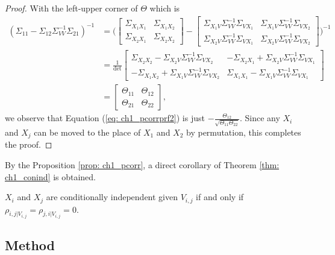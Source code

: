 \begin{proof}
    With the left-upper corner of $\Theta$ which is
    \begin{align*}
        (\Sigma_{11}-\Sigma_{12}\Sigma_{VV}^{-1}\Sigma_{21})^{-1} &= \bigg(\begin{bmatrix}
            \Sigma_{X_1X_1} & \Sigma_{X_1X_2} \\
            \Sigma_{X_2X_1} & \Sigma_{X_2X_2}
        \end{bmatrix}-\begin{bmatrix}
            \Sigma_{X_1V}\Sigma_{VV}^{-1}\Sigma_{VX_1} & \Sigma_{X_1V}\Sigma_{VV}^{-1}\Sigma_{VX_2} \\
            \Sigma_{X_2V}\Sigma_{VV}^{-1}\Sigma_{VX_1} & \Sigma_{X_2V}\Sigma_{VV}^{-1}\Sigma_{VX_2}
        \end{bmatrix}\bigg)^{-1} \\
                &= \frac{1}{\text{det}}\begin{bmatrix}
                    \Sigma_{X_2X_2}-\Sigma_{X_2V}\Sigma_{VV}^{-1}\Sigma_{VX_2} & -\Sigma_{X_2X_1}+\Sigma_{X_2V}\Sigma_{VV}^{-1}\Sigma_{VX_1} \\
                    -\Sigma_{X_1X_2}+\Sigma_{X_1V}\Sigma_{VV}^{-1}\Sigma_{VX_2} & \Sigma_{X_1X_1}-\Sigma_{X_1V}\Sigma_{VV}^{-1}\Sigma_{VX_1}
                \end{bmatrix} \\
                &= \begin{bmatrix}
                    \Theta_{11} & \Theta_{12} \\
                    \Theta_{21} & \Theta_{22}
                \end{bmatrix},
    \end{align*}
    we observe that Equation (\ref{eq: ch1_pcorrprf2}) is just $-\frac{\Theta_{12}}{\sqrt{\Theta_{11}\Theta_{22}}}$.
    Since any $X_i$ and $X_j$ can be moved to the place of $X_1$ and $X_2$ by permutation, this completes the proof. 
\end{proof}

By the Proposition \ref{prop: ch1_pcorr}, a direct corollary of Theorem \ref{thm: ch1_conind} is obtained. 
\begin{corollary}
    $X_i$ and $X_j$ are conditionally independent given $V_{i,j}$ if and only if $\rho_{i,j|V_{i,j}}=\rho_{j,i|V_{i,j}}=0$.
\end{corollary}

\subsection{Method}

